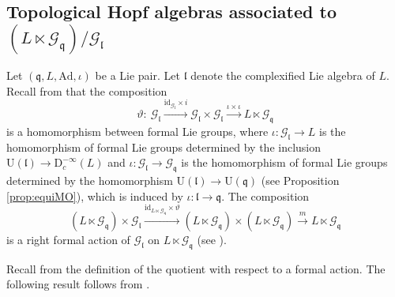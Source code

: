\documentclass[12pt, a4paper]{amsart}
\newcommand{\CG}{{\mathcal {G}}}
\newcommand{\RD}{{\mathrm {D}}}
\newcommand{\Ri}{{\mathrm{i}}}
\newcommand{\RU}{{\mathrm {U}}}
\newcommand{\Ad}{{\mathrm{Ad}}}
\newcommand{\wh}{\widehat}
\newcommand{\q}{\mathfrak q}
\renewcommand{\l}{\mathfrak l}
\newcommand{\be}{\begin {equation}}
\newcommand{\ee}{\end {equation}}
\theoremstyle{Theorem}
\theoremstyle{Theorem}
\theoremstyle{Theorem}
\theoremstyle{Theorem}
\theoremstyle{Plain}
\theoremstyle{remark}
\theoremstyle{remark}
\theoremstyle{Definition}
\numberwithin{equation}{section}
\begin{document}
 

\subsection{Topological Hopf algebras associated to $(L\ltimes \CG_{\q})/\CG_{\l}$}
Let $(\q,L,\Ad,\iota)$ be a Lie pair. 
Let $\l$ denote the complexified Lie algebra of $L$.
Recall from \cite[Proposition 8.3]{CSW4} that the composition 
\be\label{eq:idtimesi}  \vartheta: \ \CG_{\l}\xrightarrow{\mathrm{id}_{\CG_{\l}}\times i}\CG_{\l} \times \CG_{\l}\xrightarrow{\iota\times \iota} L\ltimes \CG_{\q} \ee is  a homomorphism between formal Lie groups, where
$\iota: \CG_{\l}\rightarrow L$ is the homomorphism of formal Lie groups determined by the inclusion $\RU(\l)\rightarrow \RD^{-\infty}_c(L)$ and $\iota: \CG_{\l}\rightarrow \CG_{\q}$ is the homomorphism of formal Lie groups determined by the homomorphism $ \RU(\l)\rightarrow \RU(\q)$ (see Proposition \ref{prop:equiMO}), which is induced by $\iota: \l\rightarrow \q$. 
The composition 
\be\label{eq:Llonsemi} (L\ltimes \CG_\q)\times \CG_{\l} \xrightarrow{\mathrm{id}_{L\ltimes \CG_\q}\times \vartheta} (L\ltimes \CG_\q) \times (L\ltimes \CG_\q) \xrightarrow {m} L\ltimes \CG_\q\ee is a right formal action of $\CG_{\l}$ on $L\ltimes \CG_\q$ (see \cite[Proposition 8.3]{CSW4}). 

Recall from \cite[Section 7.1]{CSW4} the definition of the quotient
with respect to a formal action. The following result follows from \cite[Theorem 7.8, Propositions 8.3 and 9.4]{CSW4}.
\end{document}
